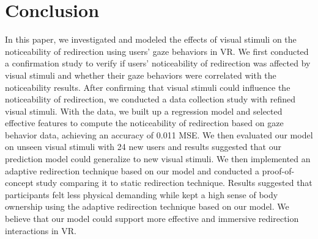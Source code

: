 \section{Conclusion}

In this paper, we investigated and modeled the effects of visual stimuli on the noticeability of redirection using users' gaze behaviors in VR.
We first conducted a confirmation study to verify if users' noticeability of redirection was affected by visual stimuli and whether their gaze behaviors were correlated with the noticeability results.
After confirming that visual stimuli could influence the noticeability of redirection, we conducted a data collection study with refined visual stimuli.
With the data, we built up a regression model and selected effective features to compute the noticeability of redirection based on gaze behavior data, achieving an accuracy of 0.011 MSE.
We then evaluated our model on unseen visual stimuli with 24 new users and results suggested that our prediction model could generalize to new visual stimuli.
We then implemented an adaptive redirection technique based on our model and conducted a proof-of-concept study comparing it to static redirection technique.
Results suggested that participants felt less physical demanding while kept a high sense of body ownership using the adaptive redirection technique based on our model.
We believe that our model could support more effective and immersive redirection interactions in VR.

